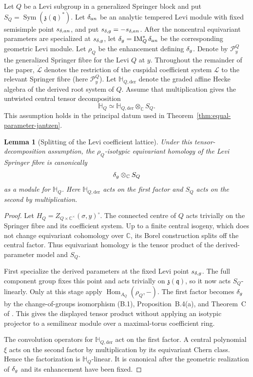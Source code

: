 \documentclass[10pt,a4paper]{amsart}
\newtheorem{lemma}[theorem]{Lemma}
\newcommand{\Hh}{\mathbb H}
\begin{document}
Let $Q$ be a Levi subgroup in a generalized Springer block and put
$S_Q=\operatorname{Sym}(\mathfrak z(\mathfrak q)^*)$.  Let $\delta_{\rm an}$
be an analytic tempered Levi module with fixed semisimple point
$s_{\delta,{\rm an}}$, and put
$s_{\delta,{\rm g}}=-s_{\delta,{\rm an}}$.  After the noncentral equivariant
parameters are specialized at $s_{\delta,{\rm g}}$, let
$\delta_{\rm g}=\operatorname{IM}_Q^*\delta_{\rm an}$ be the corresponding
geometric Levi module.  Let $\rho_Q$ be the enhancement defining
$\delta_{\rm g}$.  Denote by $\mathcal P_y^Q$ the generalized Springer fibre
for the Levi $Q$ at $y$.  Throughout the remainder of the paper,
$\dot{\mathcal L}$ denotes the restriction of the cuspidal coefficient
system $\mathcal L$ to the relevant Springer fibre (here $\mathcal P_y^Q$).
Let $\Hh_{Q,\mathrm{der}}$ denote the graded affine Hecke algebra of the
derived root system of $Q$.  Assume that multiplication gives the untwisted
central tensor decomposition
\[
 \Hh_Q\simeq \Hh_{Q,\mathrm{der}}\otimes_{\mathbb C}S_Q.
\]
This assumption holds in
the principal datum used in Theorem~\ref{thm:equal-parameter-jantzen}.

\begin{lemma}[Splitting of the Levi coefficient lattice]
\label{lem:levi-coefficient-splitting}
Under this tensor-decomposition assumption, the
$\rho_Q$-isotypic equivariant homology of the Levi Springer fibre is
canonically
\[
 \delta_{\rm g}\otimes_{\mathbb C}S_Q
\]
as a module for $\Hh_Q$.
Here $\Hh_{Q,\mathrm{der}}$ acts on the first factor and $S_Q$ acts on the
second by multiplication.
\end{lemma}

\begin{proof}
Let $H_Q=Z_{Q\times\mathbb C^\times}(\sigma,y)^\circ$.
The connected centre of $Q$ acts trivially on the Springer fibre and its
coefficient system.  Up to a finite central isogeny, which does not
change equivariant cohomology over $\mathbb C$, its Borel construction
splits off the central factor.  Thus equivariant homology is the tensor
product of the derived-parameter model and $S_Q$.

First specialize the derived parameters at the fixed Levi point
$s_{\delta,{\rm g}}$.  The full component group fixes this point and
acts trivially on $\mathfrak z(\mathfrak q)$, so it now acts
$S_Q$-linearly.  Only at this stage apply
$\operatorname{Hom}_{A_Q}(\rho_Q,-)$.
The first factor becomes $\delta_{\rm g}$ by the change-of-groups
isomorphism (B.1), Proposition~B.4(a), and Theorem~C of
\cite{Solleveld}.  This gives the displayed tensor product without
applying an isotypic projector to a semilinear module over a
maximal-torus coefficient ring.

The convolution operators for $\Hh_{Q,\mathrm{der}}$ act on the first
factor.  A central polynomial $\xi$ acts on the second factor by
multiplication by its equivariant Chern class.  Hence the factorization
is $\Hh_Q$-linear.  It is canonical after the geometric realization of
$\delta_{\rm g}$ and its enhancement have been fixed.
\end{proof}
\end{document}
